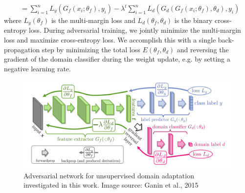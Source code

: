 \documentclass{sigkddExp}
\begin{document}
\begin{itemize}[topsep=0pt,itemsep=-1ex,partopsep=1ex,parsep=1ex]
    \begin{equation}
    \left.\begin{aligned}
     &= \sum_{i=1}^{n}L_y(G_f(x_i;\theta_f), y_i) 
      - \lambda^{t} \sum_{i=1}^{n}L_d(G_d(G_f(x_i;\theta_f), \theta_d), y_i)
    \end{aligned}\right.
    \end{equation}
    where $L_y(\theta_f)$ is the multi-margin loss and $L_d(\theta_f, \theta_d)$ is the binary cross-entropy loss. During adversarial training, we jointly minimize the multi-margin loss and maximize cross-entropy loss. We accomplish this with a single back-propagation step by minimizing the total loss $E(\theta_f, \theta_d)$ and reversing the gradient of the domain classifier during the weight update, e.g. by setting a negative learning rate.
\end{itemize}


\begin{figure}[h]
\centering
\includegraphics[width=\columnwidth]{img/adversary}
\caption{Adversarial network for unsupervised domain adaptation investigated in this work. Image source: Ganin et al., 2015 \protect\cite{ganin2015unsupervised}}
\label{fig:adversarial}
\end{figure}
 
\end{document}
